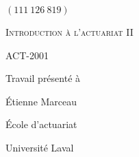 

% 

\makeatletter
\begin{titlepage}
\centering \large

\@author
\par
$(111 \ 126 \ 819)$
\vspace{0.5cm}




\vfill


{
\scshape
Introduction à l'actuariat II
\par
ACT-2001
}
\vfill


{
\bfseries \Large
\@title
}
\vfill


Travail présenté à
\par
Étienne Marceau
\vfill

École d'actuariat
\par
Université Laval
\par 
\@date
\end{titlepage}
\makeatother
